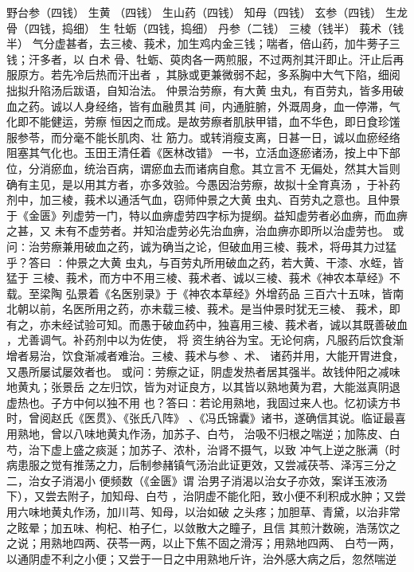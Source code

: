 \documentclass[a4paper,12pt,UTF8,twoside]{ctexbook}
\begin{document}
野台参（四钱） 生黄 （四钱） 生山药（四钱） 知母（四钱） 玄参（四钱） 生龙骨（四钱，捣细） 生 
牡蛎（四钱，捣细） 丹参（二钱） 三棱（钱半） 莪术（钱半） 
气分虚甚者，去三棱、莪术，加生鸡内金三钱；喘者，倍山药，加牛蒡子三钱；汗多者，以 
白术 
骨、牡蛎、萸肉各一两煎服，不过两剂其汗即止。汗止后再服原方。若先冷后热而汗出者 
，其脉或更兼微弱不起，多系胸中大气下陷，细阅拙拟升陷汤后跋语，自知治法。 
仲景治劳瘵，有大黄 虫丸，有百劳丸，皆多用破血之药。诚以人身经络，皆有血融贯其 
间，内通脏腑，外溉周身，血一停滞，气化即不能健运，劳瘵 
恒因之而成。是故劳瘵者肌肤甲错，血不华色，即日食珍馐服参苓，而分毫不能长肌肉、壮 
筋力。或转消瘦支离，日甚一日，诚以血瘀经络阻塞其气化也。玉田王清任着《医林改错》 
一书，立活血逐瘀诸汤，按上中下部位，分消瘀血，统治百病，谓瘀血去而诸病自愈。其立言不 
无偏处，然其大旨则确有主见，是以用其方者，亦多效验。今愚因治劳瘵，故拟十全育真汤 
，于补药剂中，加三棱，莪术以通活气血，窃师仲景之大黄 虫丸、百劳丸之意也。且仲景 
于《金匮》列虚劳一门，特以血痹虚劳四字标为提纲。益知虚劳者必血痹，而血痹之甚，又 
未有不虚劳者。并知治虚劳必先治血痹，治血痹亦即所以治虚劳也。 
或问∶治劳瘵兼用破血之药，诚为确当之论，但破血用三棱、莪术，将毋其力过猛乎？答曰 
∶仲景之大黄 虫丸，与百劳丸所用破血之药，若大黄、干漆、水蛭，皆猛于 
三棱、莪术，而方中不用三棱、莪术者、诚以三棱、莪术《神农本草经》不载。至梁陶 
弘景着《名医别录》于《神农本草经》外增药品 
三百六十五味，皆南北朝以前，名医所用之药，亦未载三棱、莪术。是当仲景时犹无三棱、 
莪术，即有之，亦未经试验可知。而愚于破血药中，独喜用三棱、莪术者，诚以其既善破血 
，尤善调气。补药剂中以为佐使， 
将 
资生纳谷为宝。无论何病，凡服药后饮食渐增者易治，饮食渐减者难治。三棱、莪术与参 
、术、 诸药并用，大能开胃进食，又愚所屡试屡效者也。 
或问∶劳瘵之证，阴虚发热者居其强半。故钱仲阳之减味地黄丸；张景岳 
之左归饮，皆为对证良方，以其皆以熟地黄为君，大能滋真阴退虚热也。子方中何以独不用 
也？答曰∶若论用熟地，我固过来人也。忆初读方书时，曾阅赵氏《医贯》、《张氏八阵》 
、《冯氏锦囊》诸书，遂确信其说。临证最喜用熟地，曾以八味地黄丸作汤，加苏子、白芍， 
治吸不归根之喘逆；加陈皮、白芍，治下虚上盛之痰涎；加苏子、浓朴，治肾不摄气，以致 
冲气上逆之胀满（时病患服之觉有推荡之力，后制参赭镇气汤治此证更效，又尝减茯苓、泽泻三分之二，治女子消渴小 
便频数（《金匮》谓 
治男子消渴以治女子亦效，案详玉液汤下），又尝去附子，加知母、白芍 
，治阴虚不能化阳，致小便不利积成水肿；又尝用六味地黄丸作汤，加川芎、知母，以治如破 
之头疼；加胆草、青黛，以治非常之眩晕；加五味、枸杞、柏子仁，以敛散大之瞳子，且信 
其煎汁数碗，浩荡饮之之说；用熟地四两、茯苓一两，以止下焦不固之滑泻；用熟地四两、 
白芍一两，以通阴虚不利之小便；又尝于一日之中用熟地斤许，治外感大病之后，忽然喘逆 
\end{document}

